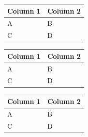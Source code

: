 \documentclass[a4paper]{article}
\begin{document}
\listoftables

\begin{center}
\begin{xtabular}{ll}
{\bf Column 1} & {\bf Column 2 }\\
\hline
A & B \\
C & D\\
\end{xtabular}
\end{center}

\begin{center}
\begin{xtabular}{ll}
{\bf Column 1} & {\bf Column 2 }\\
\hline
A & B \\
C & D\\
\end{xtabular}
\end{center}

\begin{center}
\topcaption{}
\begin{xtabular}{ll}
{\bf Column 1} & {\bf Column 2 }\\
\hline
A & B \\
C & D\\
\end{xtabular}
\end{center}
\end{document}
